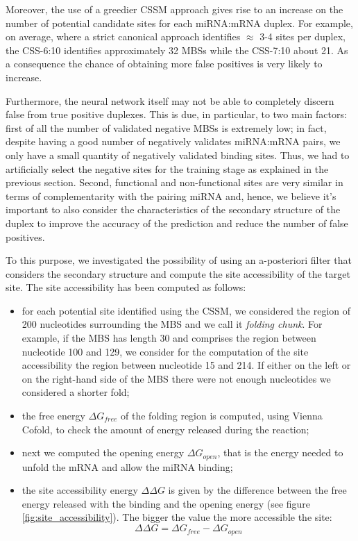 Moreover, the use of a greedier CSSM approach gives rise to an increase on the number of potential candidate sites for each miRNA:mRNA duplex. For example, on average, where a strict canonical approach identifies $\approx$ 3-4 sites per duplex, the CSS-6:10 identifies approximately 32 MBSs while the CSS-7:10 about 21. As a consequence the chance of obtaining more false positives is very likely to increase.  

Furthermore, the neural network itself may not be able to completely discern false from true positive duplexes. This is due, in particular, to two main factors: first of all the number of validated negative MBSs is extremely low; in fact, despite having  a good number of negatively validates miRNA:mRNA pairs, we only have a small quantity of negatively validated binding sites. Thus, we had to artificially select the negative sites for the training stage as explained in the previous section. Second, functional and non-functional sites are very similar in terms of complementarity with the pairing miRNA and, hence, we believe it's important to also consider the characteristics of the secondary structure of the duplex to improve the accuracy of the prediction and reduce the number of false positives.

To this purpose, we investigated the possibility of using an a-posteriori filter that considers the secondary structure and compute the site accessibility of the target site. The site accessibility has been computed as follows:
\begin{itemize}
	\item for each potential site identified using the CSSM, we considered the region of 200 nucleotides surrounding the MBS and we call it \emph{folding chunk}. For example, if the MBS has length 30 and comprises the region between nucleotide 100 and 129, we consider for the computation of the site accessibility the region between nucleotide 15 and 214. If either on the left or on the right-hand side of the MBS there were not enough nucleotides we considered a shorter fold;
	\item the free energy $\Delta G_{free}$ of the folding region is computed, using Vienna Cofold, to check the amount of energy released during the reaction;
	\item next we computed the opening energy $\Delta G_{open}$, that is the energy needed to unfold the mRNA and allow the miRNA binding;
	\item the site accessibility energy $\Delta\Delta G$ is given by the difference between the free energy released with the binding and the opening energy (see figure \ref{fig:site_accessibility}). The bigger the value the more accessible the site:
	$$\Delta\Delta G = \Delta G_{free} - \Delta G_{open}$$ 
\end{itemize}    

